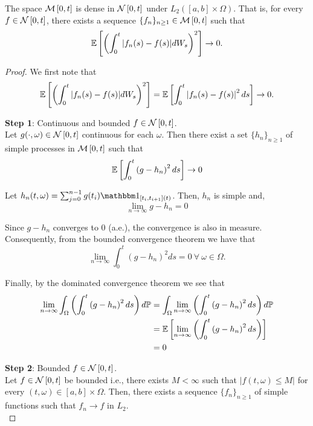 \documentclass[../TGMAFFIRO.tex]{subfiles}
\begin{document}
\begin{proposition}
	The space $\mathcal{M}\left[0, t\right]$ is dense in $\mathcal{N}\left[0, t\right]$ under $L_2([a,b]\times\Omega)$. That is, for every $f\in\mathcal{N}\left[0, t\right]$, there exists a sequence $\{f_n\}_{n\geq 1} \in \mathcal{M}\left[0, t\right]$ such that
	\begin{equation}
		\mathbb{E}\left[\left(\int_0^t |f_n(s) - f(s)|dW_s\right)^2\right] \to 0.
	\end{equation}
	
\begin{proof}
We first note that 
\begin{equation}
	\mathbb{E}\left[\left(\int_0^t |f_n(s) - f(s)|dW_s\right)^2\right] = \mathbb{E}\left[\int_0^t\left|f_n(s) - f(s) \right|^2 ds\right] \to 0.
\end{equation}

\textbf{Step 1}: Continuous and bounded $f\in\mathcal{N}\left[0, t\right]$.\\
Let $g(\cdot, \omega)\in \mathcal{N}\left[0, t\right]$ continuous for each $\omega$. Then there exist a set $\{h_n\}_{n\geq 1}$ of simple processes in $\mathcal{M}\left[0, t\right]$ such that 
	\begin{equation}
		\mathbb{E}\left[\int_0^t\left(g - h_n\right)^2 ds\right]	\to 0
	\end{equation}

Let $h_n(t, \omega) = \sum_{j=0}^{n-1}g(t_i)	\ind_{[t_i, t_{i+1}](t)}$. Then, $h_n$ is simple and,
\begin{equation}
  \lim_{n\to\infty} g - h_n = 0
\end{equation}

Since $g - h_n$ converges to 0 (a.e.), the convergence is also in measure. Consequently, from the bounded convergence theorem we have that
\begin{equation}
  \lim_{n\to\infty} \int_0^t\left(g - h_n\right)^2 ds = 0 \ \forall \ \omega \in \Omega.
\end{equation}

Finally, by the dominated convergence theorem we see that
\begin{align*}
  \lim_{n\to\infty} \int_\Omega\left(\int_0^t\left(g - h_n\right)^2 ds\right)d\mathbb{P} &=  \int_\Omega \lim_{n\to\infty} \left(\int_0^t\left(g - h_n\right)^2 ds\right)d\mathbb{P} \\
  &= \mathbb{E}\left[\lim_{n\to\infty}\left(\int_0^t\left(g - h_n\right)^2 ds\right)\right] \\
  &= 0
\end{align*}

\textbf{Step 2}: Bounded $f\in\mathcal{N}\left[0, t\right]$.\\
Let $f\in\mathcal{N}\left[0, t\right]$ be bounded i.e., there exists $M<\infty$ such that $|f(t, \omega) \leq M|$ for every $(t,\omega) \in [a,b]\times\Omega$. Then, there exists a sequence $\{f_n\}_{n\geq 1}$ of simple functions such that $f_n \to f$ in $L_2$.\\


\end{proof}
\end{proposition}
\end{document}
